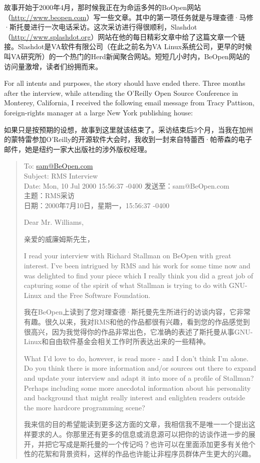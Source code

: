 \ifdefined\chs
故事开始于2000年4月，那时候我正在为命运多舛的BoOpen网站（\url{http://www.beopen.com}）写一些文章。其中的第一项任务就是与理查德·马修·斯托曼进行一次电话采访。这次采访进行得很顺利，Slashdot（\url{http://www.splashdot.org}）网站在他的每日精彩文章中给了这篇文章一个链接。Slashdot是VA软件有限公司（在此之前名为VA Linux系统公司，更早的时候叫VA研究所）的一个热门的Herd新闻聚合网站。短短几小时内，BeOpen网站的访问量激增，读者们纷拥而来。
\fi

\ifdefined\eng
For all intents and purposes, the story should have ended there. Three months after the interview, while attending the O'Reilly Open Source Conference in Monterey, California, I received the following email message from Tracy Pattison, foreign-rights manager at a large New York publishing house:
\fi

\ifdefined\chs
如果只是按预期的设想，故事到这里就该结束了。采访结束后3个月，当我在加州的蒙特雷参加O'Reilly的开源软件大会时，我收到一封来自特蕾西·帕蒂森的电子邮件，她是纽约一家大出版社的涉外版权经理。
\fi

\begin{quote}
\ifdefined\eng
To: \url{sam@BeOpen.com}\\Subject: RMS Interview\\Date: Mon, 10 Jul 2000 15:56:37 -0400
\fi
\ifdefined\chs
发送至：sam@BeOpen.com\\主题：RMS采访\\日期：2000年7月10日，星期一，15:56:37 -0400
\fi

\ifdefined\eng
Dear Mr. Williams,
\fi

\ifdefined\chs
亲爱的威廉姆斯先生，
\fi

\ifdefined\eng
I read your interview with Richard Stallman on BeOpen with great interest. I've been intrigued by RMS and his work for some time now and was delighted to find your piece which I really think you did a great job of capturing some of the spirit of what Stallman is trying to do with GNU-Linux and the Free Software Foundation.
\fi

\ifdefined\chs
我在BeOpen上读到了您对理查德·斯托曼先生所进行的访谈内容，它非常有趣。很久以来，我对RMS和他的作品都很有兴趣，看到您的作品感觉到很高兴，因为我觉得你的作品非常出色，它准确的表述了斯托曼从事GNU-Linux和自由软件基金会相关工作时所表达出来的一些精神。
\fi

\ifdefined\eng
What I'd love to do, however, is read more - and I don't think I'm alone. Do you think there is more information and/or sources out there to expand and update your interview and adapt it into more of a profile of Stallman? Perhaps including some more anecdotal information about his personality and background that might really interest and enlighten readers outside the more hardcore programming scene?
\fi

\ifdefined\chs
我来信的目的希望能读到更多这方面的文章，我相信我不是唯一一个提出这样要求的人。你那里还有更多的信息或消息源可以把你的访谈作进一步的展开，并把它写成是斯托曼的一个传记吗？也许可以在里面添加更多有关他个性的花絮和背景资料，这样的作品也许能让非程序员群体产生更大的兴趣。
\fi
\end{quote}

